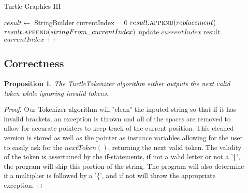 \documentclass[12pt]{article}
\newtheorem{proposition}[theorem]{Proposition}
\begin{document}
\begin{algorithm}[H]
\caption{Turtle Graphics III}
\begin{algorithmic}
        \State $result \gets$ StringBuilder
        \State currentIndex = 0
                        \State {}
                    \EndIf
                \EndFor
                    \State $result.\Call{append}{replacement}$
                \Else
                    \State $result.\Call{append}{stringFrom\_currentIndex}$
                \EndIf
                \State update $currentIndex$
            \Else
                \State result.
                \State $currentIndex++$
            \EndIf
        \EndWhile
        \State {}
    \EndProcedure
\end{algorithmic}
\end{algorithm}



\subsection{Correctness}

\begin{proposition}
The TurtleTokenizer algorithm either outputs the next valid token while ignoring invalid tokens.
\end{proposition}

\begin{proof}
Our Tokenizer algorithm will "clean" the inputed string so that if it has invalid brackets, an
exception is thrown and all of the spaces are removed to allow for accurate pointers to keep
track of the current position. This cleaned version is stored as well as the pointer as instance
variables allowing for the user to easily ask for the $nextToken()$, returning the next valid
token. The validity of the token is assertained by the if-statements, if not a valid letter or
not a '\{', the program will skip this portion of the string. The program will also determine if
a multiplier is followed by a '\{', and if not will throw the appropriate exception.
\end{proof}
\end{document}
